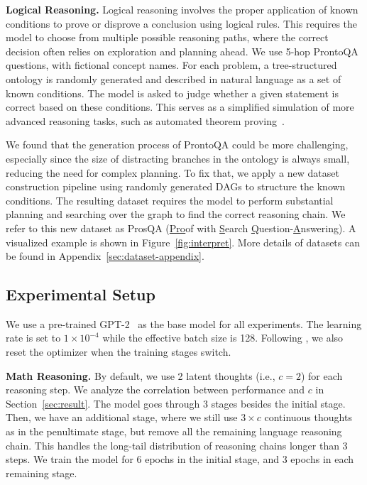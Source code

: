 \documentclass[]{fairmeta}
\begin{document}
\noindent\textbf{Logical Reasoning.} Logical reasoning involves the proper application of known conditions to prove or disprove a conclusion using logical rules. This requires the model to choose from multiple possible reasoning paths, where the correct decision often relies on exploration and planning ahead.  We use 5-hop ProntoQA~\citep{saparov2022language} questions, with fictional concept names. 
For each problem, a tree-structured ontology is randomly generated and described in natural language as a set of known conditions. The model is asked to judge whether a given statement is correct based on these conditions. This serves as a simplified simulation of more advanced reasoning tasks, such as automated theorem proving~\citep{chen2023theoremqa, alphaproof2024}.

We found that the generation process of ProntoQA could be more challenging, especially since the size of distracting branches in the ontology is always small, reducing the need for complex planning. To fix that, we apply a new dataset construction pipeline using randomly generated DAGs to structure the known conditions. The resulting dataset requires the model to perform substantial planning and searching over the graph to find the correct reasoning chain. We refer to this new dataset as ProsQA (\underline{Pro}of with \underline{S}earch \underline{Q}uestion-\underline{A}nswering). A visualized example is shown in Figure~\ref{fig:interpret}. More details of datasets can be found in Appendix~\ref{sec:dataset-appendix}.


\subsection{Experimental Setup}

We use a pre-trained GPT-2~\citep{radford2019language} as the base model for all experiments. The learning rate is set to $1\times 10^{-4}$ while the effective batch size is 128. Following \citet{deng2024explicit}, we also reset the optimizer when the training stages switch.

\noindent\textbf{Math Reasoning. }
By default, we use 2 latent thoughts (i.e., $c=2$) for each reasoning step. 
We analyze the correlation between performance and $c$ in Section~\ref{sec:result}. The model goes through 3 stages besides the initial stage. Then, we have an additional stage, where we still use $3\times c$ continuous thoughts as in the penultimate stage, but remove all the remaining language reasoning chain. This handles the long-tail distribution of reasoning chains longer than 3 steps. We train the model for 6 epochs in the initial stage, and 3 epochs in each remaining stage. 
\end{document}
